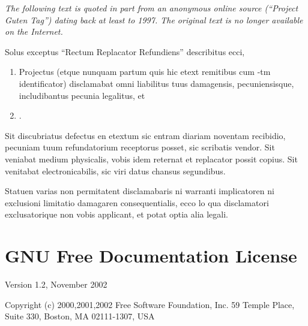 \emph{The following text is quoted in part from an anonymous online
source (\textsf{``}Project Guten Tag\textsf{''}) dating back at least to 1997. The
original text is no longer available on the Internet.}

\medskip{}


Solus exceptus \textsf{``}Rectum Replacator Refundiens\textsf{''} describitus ecci,
\begin{enumerate}
\item Projectus (etque nunquam partum quis hic etext remitibus cum -tm identificator) disclamabat omni liabilitus tuus damagensis,
pecuniensisque, includibantus pecunia legalitus, et 
\item {}. 
\end{enumerate}
Sit discubriatus defectus en etextum sic entram diariam noventam recibidio,
pecuniam tuum refundatorium receptorus posset, sic scribatis vendor.
Sit veniabat medium physicalis, vobis idem reternat et replacator
possit copius. Sit venitabat electronicabilis, sic viri datus chansus
segundibus. 


Statuen varias non permitatent disclamabaris ni warranti implicatoren
ni exclusioni limitatio damagaren consequentialis, ecco lo qua disclamatori
exclusato\-rique non vobis applicant, et potat optia alia legali.

\twocolumn

\chapter{GNU Free Documentation License\label{sec:GFDL} }

{\footnotesize{}Version 1.2, November 2002}{\footnotesize\par}

{\tiny{}Copyright (c) 2000,2001,2002 Free Software Foundation, Inc.
59 Temple Place, Suite 330, Boston, MA 02111-1307, USA}{\tiny\par}

